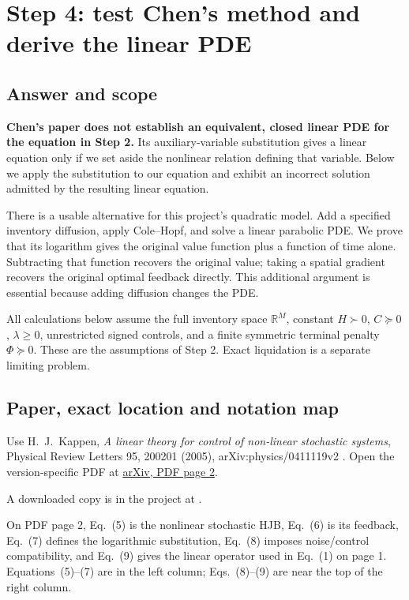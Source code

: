 \section{Step 4: test Chen's method and derive the linear PDE}
\label{sec:stage4}

\subsection*{Answer and scope}

\textbf{Chen's paper does not establish an equivalent, closed linear PDE
for the equation in Step 2.} Its auxiliary-variable substitution gives a
linear equation only if we set aside the nonlinear relation defining that
variable. Below we apply the substitution to our equation and exhibit an
incorrect solution admitted by the resulting linear equation.

There is a usable alternative for this project's quadratic model. Add a
specified inventory diffusion, apply Cole--Hopf, and solve a linear
parabolic PDE. We prove that its logarithm gives the original value
function plus a function of time alone. Subtracting that function recovers
the original value; taking a spatial gradient recovers the original
optimal feedback directly. This additional argument is essential because
adding diffusion changes the PDE.

All calculations below assume the full inventory space $\mathbb R^M$,
constant $H\succ0$, $C\succeq0$, $\lambda\ge0$, unrestricted signed
controls, and a finite symmetric terminal penalty $\Phi\succeq0$.
These are the assumptions of Step 2. Exact liquidation is a separate
limiting problem.

\subsection*{Paper, exact location and notation map}

Use H.~J.~Kappen, \emph{A linear theory for control of non-linear
stochastic systems}, Physical Review Letters 95, 200201 (2005),
arXiv:physics/0411119v2 \cite{kappen2005}.
Open the version-specific PDF at
\href{https://arxiv.org/pdf/physics/0411119v2#page=2}{arXiv, PDF page 2}.

A downloaded copy is in the project at
.

On PDF page 2, Eq.~(5) is the nonlinear stochastic HJB, Eq.~(6) is its
feedback, Eq.~(7) defines the logarithmic substitution, Eq.~(8) imposes
noise/control compatibility, and Eq.~(9) gives the linear operator used
in Eq.~(1) on page 1. Equations~(5)--(7) are in the left column;
Eqs.~(8)--(9) are near the top of the right column.

